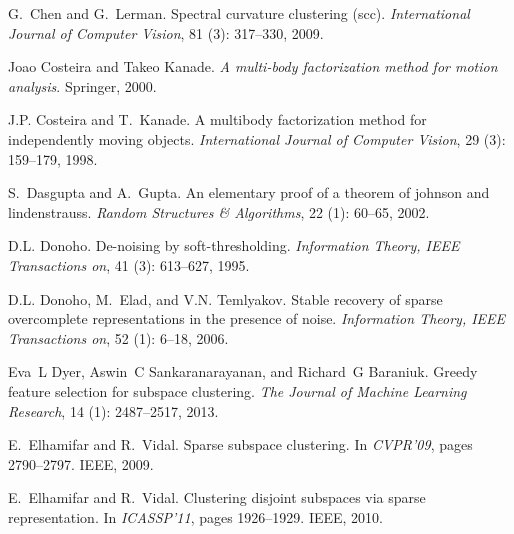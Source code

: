 \documentclass{ctexart}
\begin{document}
\begin{thebibliography}{47}
    G.~Chen and G.~Lerman.
    \newblock Spectral curvature clustering (scc).
    \newblock \emph{International Journal of Computer Vision}, 81
    (3): 317--330, 2009.

    Joao Costeira and Takeo Kanade.
    \newblock \emph{A multi-body factorization method for motion analysis}.
    \newblock Springer, 2000.

    J.P. Costeira and T.~Kanade.
    \newblock A multibody factorization method for independently moving objects.
    \newblock \emph{International Journal of Computer Vision}, 29
    (3): 159--179, 1998.

    S.~Dasgupta and A.~Gupta.
    \newblock An elementary proof of a theorem of johnson and lindenstrauss.
    \newblock \emph{Random Structures \& Algorithms}, 22 (1):
    60--65, 2002.

    D.L. Donoho.
    \newblock De-noising by soft-thresholding.
    \newblock \emph{Information Theory, IEEE Transactions on}, 41
    (3): 613--627, 1995.

    D.L. Donoho, M.~Elad, and V.N. Temlyakov.
    \newblock Stable recovery of sparse overcomplete representations in the
    presence of noise.
    \newblock \emph{Information Theory, IEEE Transactions on}, 52
    (1): 6--18, 2006.

    Eva~L Dyer, Aswin~C Sankaranarayanan, and Richard~G Baraniuk.
    \newblock Greedy feature selection for subspace clustering.
    \newblock \emph{The Journal of Machine Learning Research}, 14
    (1): 2487--2517, 2013.

    E.~Elhamifar and R.~Vidal.
    \newblock Sparse subspace clustering.
    \newblock In \emph{CVPR'09}, pages 2790--2797. IEEE, 2009.

    E.~Elhamifar and R.~Vidal.
    \newblock Clustering disjoint subspaces via sparse representation.
    \newblock In \emph{ICASSP'11}, pages 1926--1929. IEEE, 2010.


\end{thebibliography}
\end{document}
